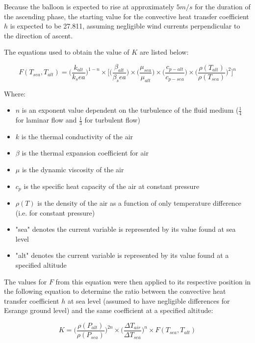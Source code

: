 Because the balloon is expected to rise at approximately $5 m/s$ for the duration of the ascending phase, the starting value for the convective heat transfer coefficient $h$ is expected to be 27.811, assuming negligible wind currents perpendicular to the direction of ascent. %

The equations used to obtain the value of $K$ are listed below:

\begin{equation*}
F(T_{sea}, T_{alt}) = \big(\frac{k_{alt}}{k_sea}\big)^{1-n}\times \Big[\Big(\frac{\beta_{alt}}{\beta_sea}\Big)\times \Big(\frac{\mu_{sea}}{\mu_{alt}}\Big)\times \Big(\frac{c_{p-alt}}{c_{p-sea}}\Big)\times \Big(\frac{\rho(T_{alt})}{\rho(T_{sea})}\Big)^{2}\Big]^{n}
\end{equation*}

Where:
\begin{itemize}
    \item $n$ is an exponent value dependent on the turbulence of the fluid medium ($\frac{1}{4}$ for laminar flow and $\frac{1}{3}$ for turbulent flow)
    \item $k$ is the thermal conductivity of the air
    \item $\beta$ is the thermal expansion coefficient for air
    \item $\mu$ is the dynamic viscosity of the air
    \item $c_{p}$ is the specific heat capacity of the air at constant pressure
    \item $\rho(T)$ is the density of the air as a function of only temperature difference (i.e. for constant pressure)
    \item "sea" denotes the current variable is represented by its value found at sea level
    \item "alt" denotes the current variable is represented by its value found at a specified altitude
\end{itemize}


The values for $F$ from this equation were then applied to its respective position in the following equation to determine the ratio between the convective heat transfer coefficient $h$ at sea level (assumed to have negligible differences for Esrange ground level) and the same coefficient at a specified altitude:

\begin{equation*}
K = \Big(\frac{\rho(P_{alt})}{\rho(P_{sea})}\Big)^{2n}\times \Big(\frac{\Delta T_{air}}{\Delta T_{sea}}\Big)^{n}\times F(T_{sea}, T_{alt})
\end{equation*}

